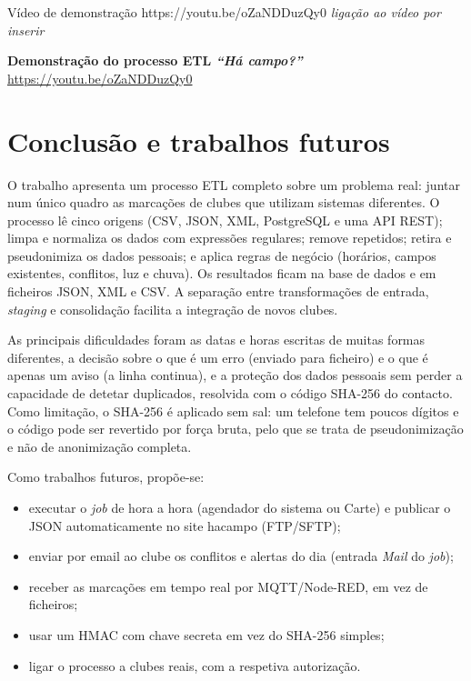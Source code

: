 \documentclass[11pt,a4paper]{article}
\newcommand{\videoURL}{https://youtu.be/oZaNDDuzQy0}
\begin{document}
\begin{videoBox}{Vídeo de demonstração}
\ifx\videoURL\empty
    {\color{red}\textit{ligação ao vídeo por inserir}}
\else
    \begin{minipage}[c]{3.3cm}
        \begingroup\edef\x{\endgroup\noexpand\qrcode[height=3cm]{\videoURL}}\x
    \end{minipage}%
    \hfill
    \begin{minipage}[c]{0.72\linewidth}
        \textbf{Demonstração do processo ETL \textit{``Há campo?''}}\\[2pt]
        \expandafter\url\expandafter{\videoURL}
    \end{minipage}
\fi
\end{videoBox}

\section{Conclusão e trabalhos futuros}

O trabalho apresenta um processo ETL completo sobre um problema real: juntar num único quadro as marcações de clubes que utilizam sistemas diferentes. O processo lê cinco origens (CSV, JSON, XML, PostgreSQL e uma API REST); limpa e normaliza os dados com expressões regulares; remove repetidos; retira e pseudonimiza os dados pessoais; e aplica regras de negócio (horários, campos existentes, conflitos, luz e chuva). Os resultados ficam na base de dados e em ficheiros JSON, XML e CSV. A separação entre transformações de entrada, \textit{staging} e consolidação facilita a integração de novos clubes.

As principais dificuldades foram as datas e horas escritas de muitas formas diferentes, a decisão sobre o que é um erro (enviado para ficheiro) e o que é apenas um aviso (a linha continua), e a proteção dos dados pessoais sem perder a capacidade de detetar duplicados, resolvida com o código SHA-256 do contacto. Como limitação, o SHA-256 é aplicado sem sal: um telefone tem poucos dígitos e o código pode ser revertido por força bruta, pelo que se trata de pseudonimização e não de anonimização completa.

Como trabalhos futuros, propõe-se:
\begin{itemize}[itemsep=1pt]
    \item executar o \textit{job} de hora a hora (agendador do sistema ou Carte) e publicar o JSON automaticamente no site hacampo (FTP/SFTP);
    \item enviar por email ao clube os conflitos e alertas do dia (entrada \textit{Mail} do \textit{job});
    \item receber as marcações em tempo real por MQTT/Node-RED, em vez de ficheiros;
    \item usar um HMAC com chave secreta em vez do SHA-256 simples;
    \item ligar o processo a clubes reais, com a respetiva autorização.
\end{itemize}
\end{document}

